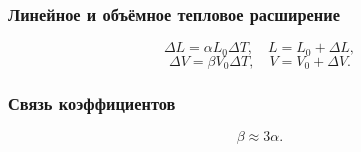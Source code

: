 \documentclass[12pt, a4paper]{article}
\begin{document}
\subsubsection*{Линейное и объёмное тепловое расширение}

\[
  \Delta L = \alpha L_0 \Delta T, \quad L = L_0 + \Delta L,
\]
\[
  \Delta V = \beta V_0 \Delta T, \quad V = V_0 + \Delta V.
\]

\subsubsection*{Связь коэффициентов}

\[
  \beta \approx 3\alpha.
\]
\end{document}
